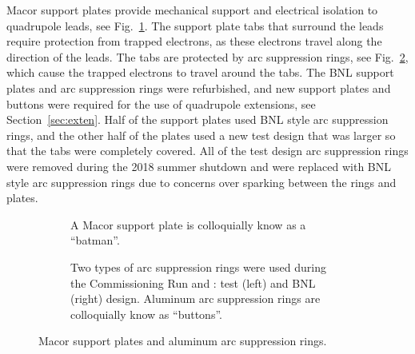 Macor support plates provide mechanical support and electrical isolation to quadrupole leads, see Fig.~\ref{fig:batman}. The support plate tabs that surround the leads require protection from trapped electrons, as these electrons travel along the direction of the leads. The tabs are protected by arc suppression rings, see Fig.~\ref{fig:buttons}, which cause the trapped electrons to travel around the tabs. The BNL support plates and arc suppression rings were refurbished, and new support plates and buttons were required for the use of quadrupole extensions, see Section~\ref{sec:exten}. Half of the support plates used BNL style arc suppression rings, and the other half of the plates used a new test design that was larger so that the tabs were completely covered. All of the test design arc suppression rings were removed during the 2018 summer shutdown and were replaced with BNL style arc suppression rings due to concerns over sparking between the rings and plates. 
\begin{figure}[]
	\centering
	\begin{subfigure}{\columnwidth}
		\caption{A Macor support plate is colloquially know as a ``batman''.}\label{fig:batman}
	\end{subfigure}
	\begin{subfigure}{\columnwidth}
		\caption{Two types of arc suppression rings were used during the Commissioning Run and \runone: test (left) and BNL (right) design. Aluminum arc suppression rings are colloquially know as ``buttons''.}\label{fig:buttons}
	\end{subfigure}
	\caption{Macor support plates and aluminum arc suppression rings.}\label{fig:batman_buttons}
\end{figure}

